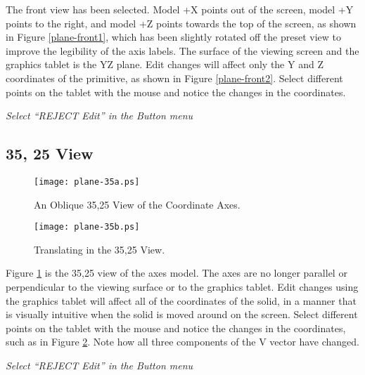The front view has been selected.  Model +X points out of the screen,
model +Y points to the right, and model +Z points towards the top
of the screen, as shown in Figure \ref{plane-front1},
which has been slightly rotated off the preset view to improve
the legibility of the axis labels.
The surface of the viewing screen and the graphics tablet is the YZ
plane.  Edit changes will affect only the Y and Z
coordinates of the primitive, as shown in Figure \ref{plane-front2}.
Select different points on the tablet with the mouse and notice the
changes in the coordinates.

{\em Select ``REJECT Edit'' in the Button menu}

\subsection{35, 25 View}
\begin{figure}
\centering \texttt{[image: plane-35a.ps]}
\caption{An Oblique 35,25 View of the Coordinate Axes.}
\label{plane-35a}
\end{figure}
\begin{figure}
\centering \texttt{[image: plane-35b.ps]}
\caption{Translating in the 35,25 View.}
\label{plane-35b}
\end{figure}


Figure \ref{plane-35a} is the 35,25 view of the axes model.
The axes are no longer
parallel or perpendicular to the viewing surface or to the graphics tablet.
Edit changes using the graphics tablet will affect all of the coordinates of
the solid, in a manner that is visually intuitive when the solid
is moved around on the screen.
Select different points on the tablet with the mouse and notice the
changes in the coordinates, such as in Figure \ref{plane-35b}.
Note how all three components of the V vector have changed.

{\em Select ``REJECT Edit'' in the Button menu}
